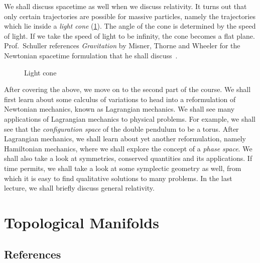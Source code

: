 \documentclass[a4 paper, 12pt]{book}
\theoremstyle{definition}
\begin{document}
    We shall discuss spacetime as well when we discuss relativity. It turns out that only certain trajectories are possible for massive particles, namely the trajectories which lie inside a \textit{light cone} (\cref{fig:lightcone}). The angle of the cone is determined by the speed of light. If we take the speed of light to be infinity, the cone becomes a flat plane. Prof.\ Schuller references \textit{Gravitation} by Misner, Thorne and Wheeler for the Newtonian spacetime formulation that he shall discuss~\cite{Misner}.

    \begin{figure}[htb]
        \centering
        \caption{Light cone}
        \label{fig:lightcone}
    \end{figure}

    After covering the above, we move on to the second part of the course. We shall first learn about some calculus of variations to head into a reformulation of Newtonian mechanics, known as Lagrangian mechanics. We shall see many applications of Lagrangian mechanics to physical problems. For example, we shall see that the \textit{configuration space} of the double pendulum to be a torus. After Lagrangian mechanics, we shall learn about yet another reformulation, namely Hamiltonian mechanics, where we shall explore the concept of a \textit{phase space}. We shall also take a look at symmetries, conserved quantities and its applications. If time permits, we shall take a look at some symplectic geometry as well, from which it is easy to find qualitative solutions to many problems. In the last lecture, we shall briefly discuss general relativity.

    \chapter{Topological Manifolds}

    \section{References}
\end{document}
